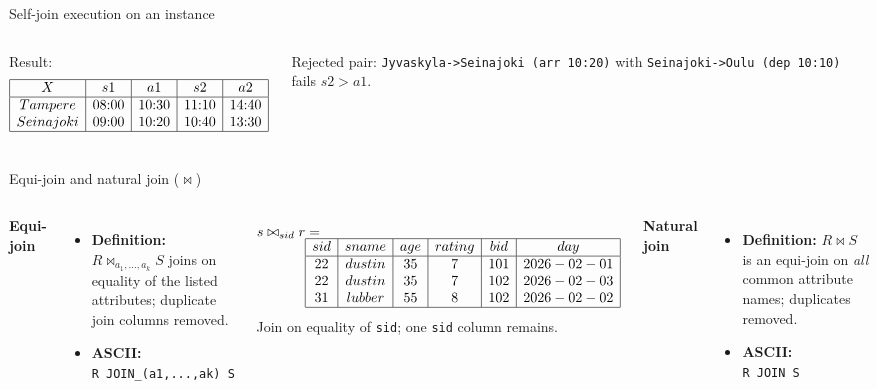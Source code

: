 \documentclass[10pt,aspectratio=169]{beamer}
\begin{document}
\begin{frame}{Self-join execution on an instance}
\begin{columns}[T,onlytextwidth]
\vspace{0.3em}
Result:
\[
\begin{array}{|c|c|c|c|c|}\hline
X&s1&a1&s2&a2\\\hline
Tampere&08{:}00&10{:}30&11{:}10&14{:}40\\
Seinajoki&09{:}00&10{:}20&10{:}40&13{:}30\\\hline
\end{array}
\]

Rejected pair:
\texttt{Jyvaskyla->Seinajoki (arr 10:20)} with
\texttt{Seinajoki->Oulu (dep 10:10)} fails \(s2>a1\).
\end{columns}
\end{frame}


\begin{frame}{Equi-join and natural join \texorpdfstring{($\bowtie$)}{(bowtie)}}
\begin{columns}[T,onlytextwidth]
\small
\textbf{Equi-join}

\begin{itemize}
  \item \textbf{Definition:} \(R \bowtie_{a_1,\dots,a_k} S\) joins on equality of
        the listed attributes; duplicate join columns removed.
  \item \textbf{ASCII:}\\[-0.2em]
        \texttt{R JOIN\_(a1,...,ak) S}
\end{itemize}

\vspace{0.2em}
\scriptsize
\[
\begin{aligned}
s \bowtie_{sid} r &=\\[-0.6em]
&\begin{array}{|c|c|c|c|c|c|}\hline
sid&sname&age&rating&bid&day\\\hline
22&dustin&35&7&101&2026-02-01\\
22&dustin&35&7&102&2026-02-03\\
31&lubber&55&8&102&2026-02-02\\\hline
\end{array}
\end{aligned}
\]
\scriptsize Join on equality of \texttt{sid}; one \texttt{sid} column remains.

\small
\textbf{Natural join}

\begin{itemize}
  \item \textbf{Definition:} \(R \bowtie S\) is an equi-join on \emph{all}
        common attribute names; duplicates removed.
  \item \textbf{ASCII:}\\[-0.2em]
        \texttt{R JOIN S}
\end{itemize}


\end{columns}
\end{frame}
\end{document}
